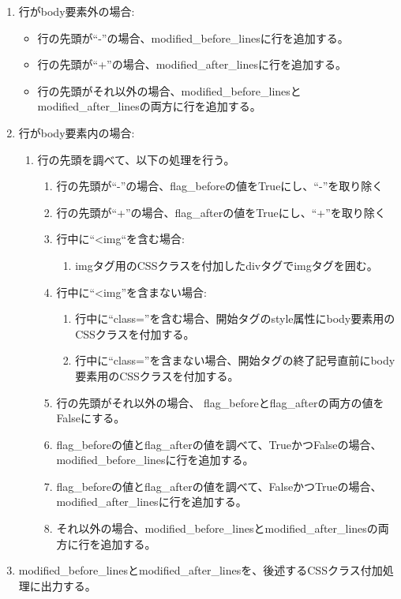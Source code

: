 \begin{enumerate}
    \item 行がbody要素外の場合:
          \begin{itemize}
              \item 行の先頭が“-”の場合、modified\_before\_linesに行を追加する。
              \item 行の先頭が“+”の場合、modified\_after\_linesに行を追加する。
              \item 行の先頭がそれ以外の場合、modified\_before\_linesとmodified\_after\_linesの両方に行を追加する。
          \end{itemize}
    \item 行がbody要素内の場合:
          \begin{enumerate}
              \item 行の先頭を調べて、以下の処理を行う。
                    \begin{enumerate}
                        \item 行の先頭が“-”の場合、flag\_beforeの値をTrueにし、“-”を取り除く
                        \item 行の先頭が“+”の場合、flag\_afterの値をTrueにし、“+”を取り除く
                        \item 行中に“\textless img“を含む場合:
                              \begin{enumerate}
                                  \item imgタグ用のCSSクラスを付加したdivタグでimgタグを囲む。
                              \end{enumerate}
                        \item 行中に“\textless img”を含まない場合:
                              \begin{enumerate}
                                  \item 行中に“class=”を含む場合、開始タグのstyle属性にbody要素用のCSSクラスを付加する。
                                  \item 行中に“class=”を含まない場合、開始タグの終了記号直前にbody要素用のCSSクラスを付加する。
                              \end{enumerate}
                        \item 行の先頭がそれ以外の場合、
                              flag\_beforeとflag\_afterの両方の値をFalseにする。
                        \item flag\_beforeの値とflag\_afterの値を調べて、TrueかつFalseの場合、modified\_before\_linesに行を追加する。
                        \item flag\_beforeの値とflag\_afterの値を調べて、FalseかつTrueの場合、modified\_after\_linesに行を追加する。
                        \item それ以外の場合、modified\_before\_linesとmodified\_after\_linesの両方に行を追加する。
                    \end{enumerate}
          \end{enumerate}
    \item modified\_before\_linesとmodified\_after\_linesを、後述するCSSクラス付加処理に出力する。
\end{enumerate}

